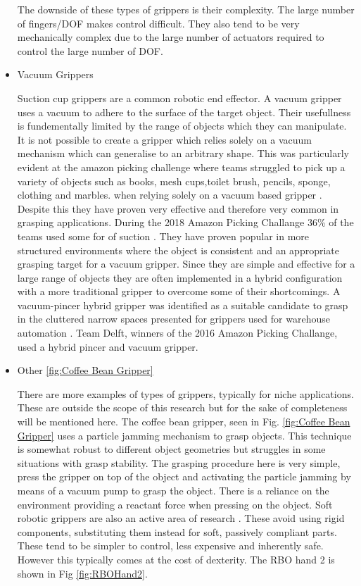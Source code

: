 \begin{itemize}
    The downside of these types of grippers is their complexity. The large number of fingers/DOF makes control difficult. They also tend to be very mechanically complex due to the large number of actuators required to control the large number of DOF.
    
    \item Vacuum Grippers
    
    Suction cup grippers are a common robotic end effector. A vacuum gripper uses a vacuum to adhere to the surface of the target object. Their usefullness is fundementally limited by the range of objects which they can manipulate. It is not possible to create a gripper which relies solely on a vacuum mechanism which can generalise to an arbitrary shape. This was particularly evident at the amazon picking challenge where teams struggled to pick up a variety of objects such as books, mesh cups,toilet brush, pencils, sponge, clothing and marbles. when relying solely on a vacuum based gripper \cite{APCGripper, APCObservations}. Despite this they have proven very effective and therefore very common in grasping applications. During the 2018 Amazon Picking Challange 36\% of the teams used some for of suction \cite{APCObservations}. They have proven popular in more structured environments where the object is consistent and an appropriate grasping target for a vacuum gripper. Since they are simple and effective for a large range of objects they are often implemented in a hybrid configuration with a more traditional gripper \cite{Nakamoto2019} to overcome some of their shortcomings. A vacuum-pincer hybrid gripper was identified as a suitable candidate to grasp in the cluttered narrow spaces presented for grippers used for warehouse automation \cite{Hasegawa2017}. Team Delft, winners of the 2016 Amazon Picking Challange, used a hybrid pincer and vacuum gripper\cite{Delft}.
    
    \item Other \ref{fig:Coffee Bean Gripper}
    
    There are more examples of types of grippers, typically for niche applications. These are outside the scope of this research but for the sake of completeness will be mentioned here. The coffee bean gripper, seen in Fig. \ref{fig:Coffee Bean Gripper} uses a particle jamming mechanism to grasp objects. This technique is somewhat robust to different object geometries but struggles in some situations with grasp stability. The grasping procedure here is very simple, press the gripper on top of the object and activating the particle jamming by means of a vacuum pump to grasp the object. There is a reliance on the environment providing a reactant force when pressing on the object. Soft robotic grippers are also an active area of research \cite{RBOHand2}. These avoid using rigid components, substituting them instead for soft, passively compliant parts. These tend to be simpler to control, less expensive and inherently safe. However this typically comes at the cost of dexterity. The RBO hand 2 is shown in Fig \ref{fig:RBOHand2}.
    
\end{itemize}

